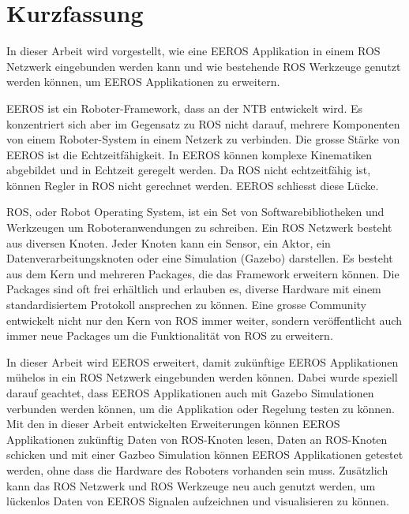 
\chapter*{Kurzfassung}
In dieser Arbeit wird vorgestellt, wie eine EEROS Applikation in einem ROS Netzwerk eingebunden werden kann und wie bestehende ROS Werkzeuge genutzt werden können, um EEROS Applikationen zu erweitern.

EEROS ist ein Roboter-Framework, dass an der NTB entwickelt wird.
Es konzentriert sich aber im Gegensatz zu ROS nicht darauf, mehrere Komponenten von einem Roboter-System in einem Netzerk zu verbinden.
Die grosse Stärke von EEROS ist die Echtzeitfähigkeit.
In EEROS können komplexe Kinematiken abgebildet und in Echtzeit geregelt werden.
Da ROS nicht echtzeitfähig ist, können Regler in ROS nicht gerechnet werden.
EEROS schliesst diese Lücke.

ROS, oder Robot Operating System, ist ein Set von Softwarebibliotheken und Werkzeugen um Roboteranwendungen zu schreiben.
Ein ROS Netzwerk besteht aus diversen Knoten.
Jeder Knoten kann ein Sensor, ein Aktor, ein Datenverarbeitungsknoten oder eine Simulation (Gazebo) darstellen.
Es besteht aus dem Kern und mehreren Packages, die das Framework erweitern können.
Die Packages sind oft frei erhältlich und erlauben es, diverse Hardware mit einem standardisiertem Protokoll ansprechen zu können.
Eine grosse Community entwickelt nicht nur den Kern von ROS immer weiter, sondern veröffentlicht auch immer neue Packages um die Funktionalität von ROS zu erweitern.

In dieser Arbeit wird EEROS erweitert, damit zukünftige EEROS Applikationen mühelos in ein ROS Netzwerk eingebunden werden können.
Dabei wurde speziell darauf geachtet, dass EEROS Applikationen auch mit Gazebo Simulationen verbunden werden können, um die Applikation oder Regelung testen zu können.
Mit den in dieser Arbeit entwickelten Erweiterungen können EEROS Applikationen zukünftig Daten von ROS-Knoten lesen, Daten an ROS-Knoten schicken und mit einer Gazbeo Simulation können EEROS Applikationen getestet werden, ohne dass die Hardware des Roboters vorhanden sein muss.
Zusätzlich kann das ROS Netzwerk und ROS Werkzeuge neu auch genutzt werden, um lückenlos Daten von EEROS Signalen aufzeichnen und visualisieren zu können.






